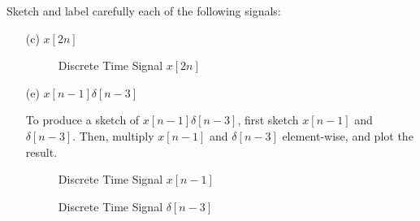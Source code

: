 \documentclass[fleqn]{article}
\begin{document}
\begin{enumerate}[nolistsep]
		Sketch and label carefully each of the following signals:
		
		\begin{enumerate}[nolistsep]
			\item[(c)] $x[2n]$
			
			\renewcommand{\thefigure}{P2.21-C}
			
			\begin{figure}[H]				
			\centerline{}
		\caption{Discrete Time Signal $x[2n]$}
		\label{part_c}
		\end{figure} \break
		
			\item[(e)] $x[n - 1]\delta[n - 3]$
			
			To produce a sketch of $x[n - 1]\delta[n - 3]$, first sketch $x[n - 1]$ and $\delta[n - 3]$. Then, multiply $x[n - 1]$ and $\delta[n - 3]$ element-wise, and plot the result.
			
			\renewcommand{\thefigure}{P2.21-E-1}
			
			\begin{figure}[H]
			\centerline{}
		\caption{Discrete Time Signal $x[n-1]$}
		\label{part_e_x_nm1}
		\end{figure}
			
			\renewcommand{\thefigure}{P2.21-E-2}
			
			\begin{figure}[H]
			\centerline{}
		\caption{Discrete Time Signal $\delta[n-3]$}
		\label{part_e_delta_nm3}
		\end{figure}
		

\end{enumerate}
\end{enumerate}
\end{document}
